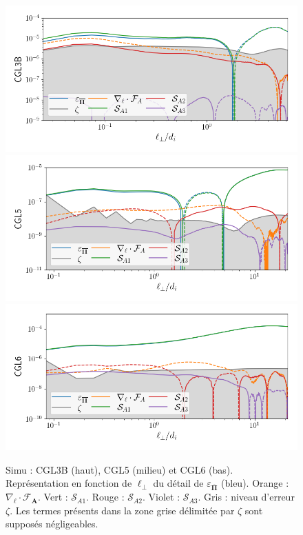  \begin{figure}[!ht]
  \centering
  \includegraphics[width=0.8\linewidth,trim=0cm 1.3cm 0cm 0.5cm, clip=true]{./Mainmatter/Part_3/images_ch3/CGL3B_compa_cgl}
 \includegraphics[width=0.8\linewidth,trim=0cm 1.3cm 0cm 0.5cm, clip=true]{./Mainmatter/Part_3/images_ch3/CGL5_compa_cgl}
  \includegraphics[width=0.8\linewidth,trim=0cm 0.5cm 0cm 0.5cm, clip=true]{./Mainmatter/Part_3/images_ch3/CGL6_compa_cgl}
 \cprotect\caption{Simu : CGL3B (haut), CGL5 (milieu) et  CGL6 (bas). Représentation  en fonction de \ensuremath{\ell_{\perp}} du détail de \ensuremath{\varepsilon_{\overline{\boldsymbol{\Pi}}}} (bleu). Orange : \ensuremath{\nabla_{\boldsymbol{\ell}} \cdot \boldsymbol{\mathcal{F}_A}}. Vert : \ensuremath{\mathcal{S}_{A1}}. Rouge : \ensuremath{\mathcal{S}_{A2}}. Violet : \ensuremath{\mathcal{S}_{A3}}. Gris : niveau d'erreur \ensuremath{\zeta}. Les termes présents dans la zone grise délimitée par \ensuremath{\zeta} sont supposés négligeables. }
 \label{fig:detail_pi_CGL3B-5-6}
 \end{figure}
